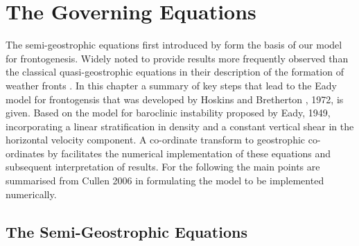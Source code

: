 \chapter{The Governing Equations \label{governingequations}}
The semi-geostrophic equations first introduced by \cite{Eliassen1962}
form the basis of our model for frontogenesis. Widely noted to provide results more frequently observed than the classical quasi-geostrophic equations in their description of the formation of weather fronts 
\cite{Cullen2006a, Hoskins1975}. 
In this chapter a summary of key steps that lead to the Eady model for frontogensis that was developed by Hoskins and Bretherton , 1972, \cite{Hoskins1972} is given. Based on the model for baroclinic instability proposed by Eady, 1949, incorporating a linear stratification in density and a constant vertical shear in the horizontal velocity component. A co-ordinate transform to geostrophic co-ordinates by  \cite{Hoskins1975} 
facilitates the numerical implementation of these equations and subsequent interpretation of results. For the following the main points are summarised from Cullen 2006 \cite{Cullen2006a} in formulating the model to be implemented numerically.
\section{The Semi-Geostrophic Equations \label{SGeqns}} 
